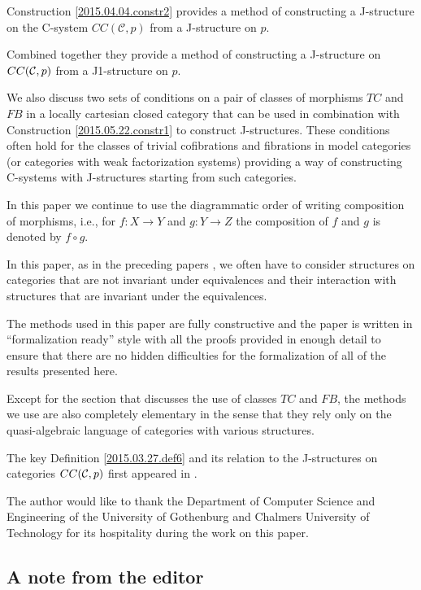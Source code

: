 \documentclass[12pt]{article}
\numberwithin{equation}{section}
\newcommand{\sr}{\rightarrow}
\newcommand{\toCC}{CC} %
\begin{document}
Construction \ref{2015.04.04.constr2} provides a method of constructing a
J-structure on the C-system $\toCC({\mathcal C},p)$ from a J-structure on $p$.

Combined together they provide a method of constructing a J-structure on
$\toCC({\cal C},p)$ from a J1-structure on $p$.

We also discuss two sets of conditions on a pair of classes of morphisms $TC$
and $FB$ in a locally cartesian closed category that can be used in combination
with Construction \ref{2015.05.22.constr1} to construct J-structures. These
conditions often hold for the classes of trivial cofibrations and fibrations in
model categories (or categories with weak factorization systems) providing a
way of constructing C-systems with J-structures starting from such categories.

In this paper we continue to use the diagrammatic order of writing composition
of morphisms, i.e., for $f:X\sr Y$ and $g:Y\sr Z$ the composition of $f$ and
$g$ is denoted by $f\circ g$.

In this paper, as in the preceding papers \cite{Cfromauniverse,fromunivwithPi},
we often have to consider structures on categories that
are not invariant under equivalences and their interaction with structures that
are invariant under the equivalences.

The methods used in this paper are fully constructive and the paper is written
in ``formalization ready'' style with all the proofs provided in enough detail
to ensure that there are no hidden difficulties for the formalization of all of
the results presented here.

Except for the section that discusses the use of classes $TC$ and $FB$, the
methods we use are also completely elementary in the sense that they rely only
on the quasi-algebraic language of categories with various structures.

The key Definition \ref{2015.03.27.def6} and its relation to the J-structures
on categories $\toCC({\cal C},p)$ first appeared in \cite{CMUtalk}.

The author would like to thank the Department of Computer Science and
Engineering of the University of Gothenburg and Chalmers University of
Technology for its hospitality during the work on this paper.


\subsection{A note from the editor}
\end{document}
